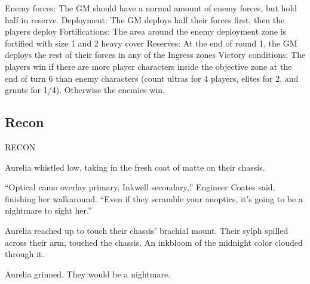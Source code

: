                                                              Enemy forces: The GM should have a  
                                                             normal amount of enemy forces, but hold half  
                                                             in reserve.  
                                                             Deployment: The GM deploys half their  
                                                            forces first, then the players deploy  
                                                             Fortifications: The area around the enemy  
                                                             deployment zone is fortified with size 1 and 2  
                                                             heavy cover  
                                                             Reserves: At the end of round 1, the GM  
                                                             deploys the rest of their forces in any of the  
                                                             Ingress zones  
                                                            Victory conditions: The players win if there  
                                                             are more player characters inside the  
                                                             objective zone at the end of turn 6 than enemy  
                                                            characters (count ultras for 4 players, elites for  
2, and grunts for 1/4). Otherwise the enemies win.  

                                                                                                                
\subsection{Recon}

RECON  

         Aurelia whistled low, taking in the fresh coat of matte on their chassis.   

          “Optical camo overlay primary, Inkwell secondary,” Engineer Coates said, finishing her walkaround.  
          “Even if they scramble your anoptics, it’s going to be a nightmare to sight her.”   

         Aurelia reached up to touch their chassis’ brachial mount. Their sylph spilled across their arm,  
         touched the chassis. An inkbloom of the midnight color clouded through it.  

         Aurelia grinned. They would be a nightmare.   


